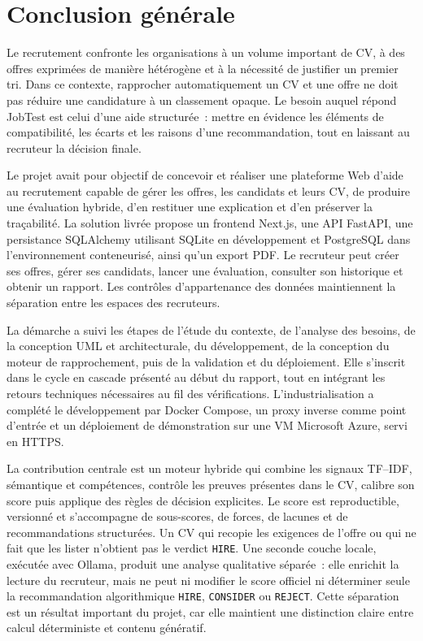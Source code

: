 \chapter*{Conclusion générale}

Le recrutement confronte les organisations à un volume important de CV, à des offres exprimées de manière hétérogène et à la nécessité de justifier un premier tri. Dans ce contexte, rapprocher automatiquement un CV et une offre ne doit pas réduire une candidature à un classement opaque. Le besoin auquel répond JobTest est celui d'une aide structurée~: mettre en évidence les éléments de compatibilité, les écarts et les raisons d'une recommandation, tout en laissant au recruteur la décision finale.

Le projet avait pour objectif de concevoir et réaliser une plateforme Web d'aide au recrutement capable de gérer les offres, les candidats et leurs CV, de produire une évaluation hybride, d'en restituer une explication et d'en préserver la traçabilité. La solution livrée propose un frontend Next.js, une API FastAPI, une persistance SQLAlchemy utilisant SQLite en développement et PostgreSQL dans l'environnement conteneurisé, ainsi qu'un export PDF. Le recruteur peut créer ses offres, gérer ses candidats, lancer une évaluation, consulter son historique et obtenir un rapport. Les contrôles d'appartenance des données maintiennent la séparation entre les espaces des recruteurs.

La démarche a suivi les étapes de l'étude du contexte, de l'analyse des besoins, de la conception UML et architecturale, du développement, de la conception du moteur de rapprochement, puis de la validation et du déploiement. Elle s'inscrit dans le cycle en cascade présenté au début du rapport, tout en intégrant les retours techniques nécessaires au fil des vérifications. L'industrialisation a complété le développement par Docker Compose, un proxy inverse comme point d'entrée et un déploiement de démonstration sur une VM Microsoft Azure, servi en HTTPS.

La contribution centrale est un moteur hybride qui combine les signaux TF--IDF, sémantique et compétences, contrôle les preuves présentes dans le CV, calibre son score puis applique des règles de décision explicites. Le score est reproductible, versionné et s'accompagne de sous-scores, de forces, de lacunes et de recommandations structurées. Un CV qui recopie les exigences de l'offre ou qui ne fait que les lister n'obtient pas le verdict \texttt{HIRE}. Une seconde couche locale, exécutée avec Ollama, produit une analyse qualitative séparée~: elle enrichit la lecture du recruteur, mais ne peut ni modifier le score officiel ni déterminer seule la recommandation algorithmique \texttt{HIRE}, \texttt{CONSIDER} ou \texttt{REJECT}. Cette séparation est un résultat important du projet, car elle maintient une distinction claire entre calcul déterministe et contenu génératif.

